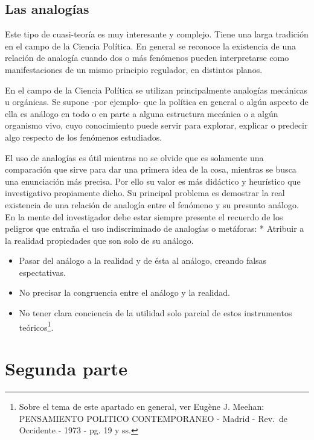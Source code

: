 \documentclass[
]{book}
\begin{document}
\hypertarget{las-analoguxedas}{%
\subsection*{Las analogías}\label{las-analoguxedas}}

Este tipo de cuasi-teoría es muy interesante y complejo. Tiene una larga tradición en el campo de la Ciencia Política. En general se reconoce la existencia de una relación de analogía cuando dos o más fenómenos pueden interpretarse como manifestaciones de un mismo principio regulador, en distintos planos.

En el campo de la Ciencia Política se utilizan principalmente analogías mecánicas u orgánicas. Se supone -por ejemplo- que la política en general o algún aspecto de ella es análogo en todo o en parte a alguna estructura mecánica o a algún organismo vivo, cuyo conocimiento puede servir para explorar, explicar o predecir algo respecto de los fenómenos estudiados.

El uso de analogías es útil mientras no se olvide que es solamente una comparación que sirve para dar una primera idea de la cosa, mientras se busca una enunciación más precisa. Por ello su valor es más didáctico y heurístico que investigativo propiamente dicho. Su principal problema es demostrar la real existencia de una relación de analogía entre el fenómeno y su presunto análogo. En la mente del investigador debe estar siempre presente el recuerdo de los peligros que entraña el uso indiscriminado de analogías o metáforas: * Atribuir a la realidad propiedades que son solo de su análogo.

\begin{itemize}
\item
  Pasar del análogo a la realidad y de ésta al análogo, creando falsas espectativas.
\item
  No precisar la congruencia entre el análogo y la realidad.
\item
  No tener clara conciencia de la utilidad solo parcial de estos instrumentos teóricos\footnote{Sobre el tema de este apartado en general, ver Eugène J. Meehan: PENSAMIENTO POLITICO CONTEMPORANEO - Madrid - Rev.~de Occidente - 1973 - pg. 19 y ss.}.
\end{itemize}

\hypertarget{segunda-parte}{%
\section*{Segunda parte}\label{segunda-parte}}
\end{document}
